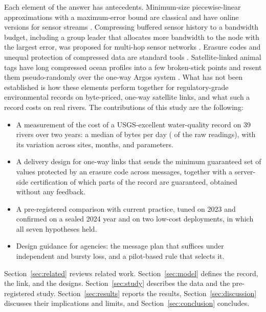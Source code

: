 Each element of the answer has antecedents. Minimum-size piecewise-linear approximations with a maximum-error bound are classical \citep{imai1988} and have online versions for sensor streams \citep{soroush2008}. Compressing buffered sensor history to a bandwidth budget, including a group leader that allocates more bandwidth to the node with the largest error, was proposed for multi-hop sensor networks \citep{deligiannakis2007}. Erasure codes and unequal protection of compressed data are standard tools \citep{reed1960,albanese1996}. Satellite-linked animal tags have long compressed ocean profiles into a few broken-stick points and resent them pseudo-randomly over the one-way Argos system \citep{boehme2009,photopoulou2015}. What has not been established is how these elements perform together for regulatory-grade environmental records on byte-priced, one-way satellite links, and what such a record costs on real rivers. The contributions of this study are the following:
\begin{itemize}
  \item A measurement of the cost of a USGS-excellent water-quality record on 39 rivers over two years: a median of \needMedConf{} bytes per day (\needShareConf{} of the raw readings), with its variation across sites, months, and parameters.
  \item A delivery design for one-way links that sends the minimum guaranteed set of values protected by an erasure code across messages, together with a server-side certification of which parts of the record are guaranteed, obtained without any feedback.
  \item A pre-registered comparison with current practice, tuned on 2023 and confirmed on a sealed 2024 year and on two low-cost deployments, in which all seven hypotheses held.
  \item Design guidance for agencies: the message plan that suffices under independent and bursty loss, and a pilot-based rule that selects it.
\end{itemize}

Section~\ref{sec:related} reviews related work. Section~\ref{sec:model} defines the record, the link, and the designs. Section~\ref{sec:study} describes the data and the pre-registered study. Section~\ref{sec:results} reports the results, Section~\ref{sec:discussion} discusses their implications and limits, and Section~\ref{sec:conclusion} concludes.
